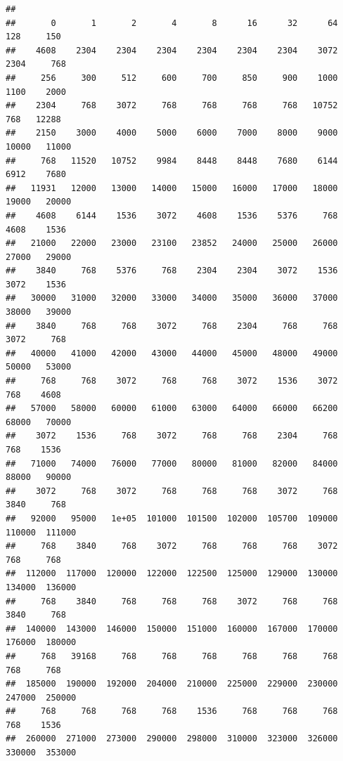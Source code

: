 \documentclass[
]{article}
\newenvironment{Shaded}{\begin{snugshade}}{\end{snugshade}}
\newcommand{\FunctionTok}[1]{\textcolor[rgb]{0.13,0.29,0.53}{\textbf{#1}}}
\newcommand{\NormalTok}[1]{#1}
\newcommand{\SpecialCharTok}[1]{\textcolor[rgb]{0.81,0.36,0.00}{\textbf{#1}}}
\begin{document}
\begin{Shaded}
\end{Shaded}

\begin{verbatim}
## 
##       0       1       2       4       8      16      32      64     128     150 
##    4608    2304    2304    2304    2304    2304    2304    3072    2304     768 
##     256     300     512     600     700     850     900    1000    1100    2000 
##    2304     768    3072     768     768     768     768   10752     768   12288 
##    2150    3000    4000    5000    6000    7000    8000    9000   10000   11000 
##     768   11520   10752    9984    8448    8448    7680    6144    6912    7680 
##   11931   12000   13000   14000   15000   16000   17000   18000   19000   20000 
##    4608    6144    1536    3072    4608    1536    5376     768    4608    1536 
##   21000   22000   23000   23100   23852   24000   25000   26000   27000   29000 
##    3840     768    5376     768    2304    2304    3072    1536    3072    1536 
##   30000   31000   32000   33000   34000   35000   36000   37000   38000   39000 
##    3840     768     768    3072     768    2304     768     768    3072     768 
##   40000   41000   42000   43000   44000   45000   48000   49000   50000   53000 
##     768     768    3072     768     768    3072    1536    3072     768    4608 
##   57000   58000   60000   61000   63000   64000   66000   66200   68000   70000 
##    3072    1536     768    3072     768     768    2304     768     768    1536 
##   71000   74000   76000   77000   80000   81000   82000   84000   88000   90000 
##    3072     768    3072     768     768     768    3072     768    3840     768 
##   92000   95000   1e+05  101000  101500  102000  105700  109000  110000  111000 
##     768    3840     768    3072     768     768     768    3072     768     768 
##  112000  117000  120000  122000  122500  125000  129000  130000  134000  136000 
##     768    3840     768     768     768    3072     768     768    3840     768 
##  140000  143000  146000  150000  151000  160000  167000  170000  176000  180000 
##     768   39168     768     768     768     768     768     768     768     768 
##  185000  190000  192000  204000  210000  225000  229000  230000  247000  250000 
##     768     768     768     768    1536     768     768     768     768    1536 
##  260000  271000  273000  290000  298000  310000  323000  326000  330000  353000 

\end{verbatim}
\end{document}
